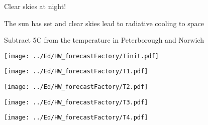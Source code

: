 
\begin{slide}{Clear skies at night!}

\begin{list0}
\item The sun has set and clear skies lead to radiative cooling to space
    \begin{list1}
    \item Subtract 5\de C from the temperature in Peterborough and Norwich
    \end{list1}
\end{list0}

\end{slide}

\begin{slide}{}
{\centering
\texttt{[image: ../Ed/HW\_forecastFactory/Tinit.pdf]}
}
\end{slide}

\begin{slide}{}
{\centering
\texttt{[image: ../Ed/HW\_forecastFactory/T1.pdf]}
}
\end{slide}

\begin{slide}{}
{\centering
\texttt{[image: ../Ed/HW\_forecastFactory/T2.pdf]}
}
\end{slide}

\begin{slide}{}
{\centering
\texttt{[image: ../Ed/HW\_forecastFactory/T3.pdf]}
}
\end{slide}

\begin{slide}{}
{\centering
\texttt{[image: ../Ed/HW\_forecastFactory/T4.pdf]}
}
\end{slide}


